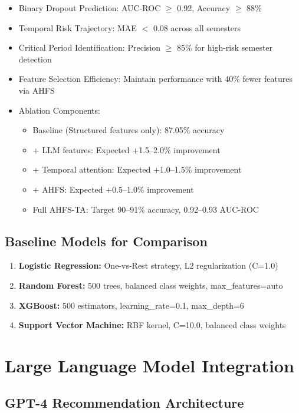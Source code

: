 \begin{itemize}
\item Binary Dropout Prediction: AUC-ROC $\geq$ 0.92, Accuracy $\geq$ 88\%
\item Temporal Risk Trajectory: MAE $<$ 0.08 across all semesters
\item Critical Period Identification: Precision $\geq$ 85\% for high-risk semester detection
\item Feature Selection Efficiency: Maintain performance with 40\% fewer features via AHFS
\item Ablation Components:
\begin{itemize}
\item Baseline (Structured features only): 87.05\% accuracy
\item + LLM features: Expected +1.5--2.0\% improvement
\item + Temporal attention: Expected +1.0--1.5\% improvement
\item + AHFS: Expected +0.5--1.0\% improvement
\item Full AHFS-TA: Target 90--91\% accuracy, 0.92--0.93 AUC-ROC
\end{itemize}
\end{itemize}

\subsection{Baseline Models for Comparison}

\begin{enumerate}
\item \textbf{Logistic Regression:} One-vs-Rest strategy, L2 regularization (C=1.0)
\item \textbf{Random Forest:} 500 trees, balanced class weights, max\_features=auto
\item \textbf{XGBoost:} 500 estimators, learning\_rate=0.1, max\_depth=6
\item \textbf{Support Vector Machine:} RBF kernel, C=10.0, balanced class weights
\end{enumerate}

\section{Large Language Model Integration}

\subsection{GPT-4 Recommendation Architecture}


